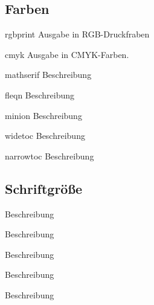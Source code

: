 \documentclass[a4paper,colorscheme=green,TUBStitlepage=picture]{tubsreprt}
\begin{document}
\subsection{Farben}

\begin{classoption}{rgbprint}
  Ausgabe in RGB-Druckfraben
\end{classoption}

\begin{classoption}{cmyk}
  Ausgabe in CMYK-Farben.
\end{classoption}


\begin{classoption}{mathserif}
  Beschreibung
\end{classoption}

\begin{classoption}{fleqn}
  Beschreibung
\end{classoption}

\begin{classoption}{minion}
  Beschreibung
\end{classoption}

\begin{classoption}{widetoc}
  Beschreibung
\end{classoption}

\begin{classoption}{narrowtoc}
  Beschreibung
\end{classoption}

\subsection{Schriftgröße}

\begin{classoption}{9pt}
  Beschreibung
\end{classoption}

\begin{classoption}{10pt}
  Beschreibung
\end{classoption}

\begin{classoption}{11pt}
  Beschreibung
\end{classoption}

\begin{classoption}{12pt}
  Beschreibung
\end{classoption}

\begin{classoption}{14pt}
  Beschreibung
\end{classoption}
\end{document}
